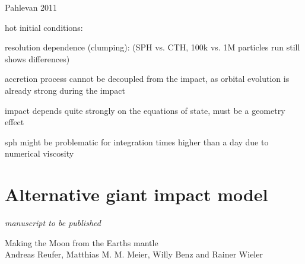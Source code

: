 \cite{2011E&PSL.301..433P} Pahlevan 2011

hot initial conditions:
\citep{2000orem.book..179P}

resolution dependence (clumping):
\citep{Canup:2010p3713} (SPH vs. CTH, 100k vs. 1M particles run still shows differences)


accretion process cannot be decoupled from the impact, as orbital evolution is already strong during the impact 

impact depends quite strongly on the equations of state, must be a geometry effect

sph might be problematic for integration times higher than a day due to numerical viscosity \citep{Canup:2004p115} 


\section{Alternative giant impact model}




\clearpage
\thispagestyle{empty}
\begin{flushright} \emph{manuscript to be published} \end{flushright}
{\Large Making the Moon from the Earths mantle} \vspace{0.5cm}\\
Andreas Reufer, Matthias M. M. Meier, Willy Benz and Rainer Wieler\\

